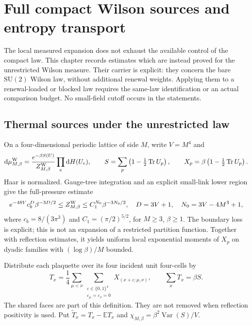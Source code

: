 \documentclass[11pt,oneside,openany]{book}
\theoremstyle{definition}
\theoremstyle{remark}
\newcommand{\E}{\mathbb E}
\newcommand{\dd}{\mathrm d}
\newcommand{\Tr}{\operatorname{Tr}}
\newcommand{\Var}{\operatorname{Var}}
\newcommand{\SU}{\mathrm{SU}}
\newcommand{\src}[2]{\cite[#2]{#1}}
\begin{document}
\chapter{Full compact Wilson sources and entropy transport}
\label{ch:full-compact-sources}
The local measured expansion does not exhaust the available control of
the compact law. This chapter records estimates which are instead
proved for the unrestricted Wilson measure. Their carrier is explicit:
they concern the bare $\SU(2)$ Wilson law, without additional renewal
weights. Applying them to a renewal-loaded or blocked law requires the
same-law identification or an actual comparison budget. No small-field
cutoff occurs in the statements.

\section{Thermal sources under the unrestricted law}
On a four-dimensional periodic lattice of side $M$, write $V=M^4$ and
\begin{equation}
 \dd\mu^{\rm W}_{M,\beta}
 =\frac{e^{-\beta S(U)}}{Z^{\rm W}_{M,\beta}}
                  \prod_e\dd H(U_e),\qquad
 S=\sum_p\left(1-\tfrac12\Tr U_p\right),\qquad
 X_p=\beta\left(1-\tfrac12\Tr U_p\right).
 \label{eq:full-Wilson-law}
\end{equation}
Haar is normalized. Gauge-tree integration and an explicit small-link
lower region give the full-pressure estimate
\begin{equation}
 e^{-48V}c_b^{D}\beta^{-3D/2}
 \le Z^{\rm W}_{M,\beta}
 \le C_1^{N_0}\beta^{-3N_0/2},\quad
 D=3V+1,\quad N_0=3V-4M^3+1,
 \label{eq:full-Wilson-pressure}
\end{equation}
where $c_b=8/(3\pi^3)$ and $C_1=(\pi/2)^{5/2}$, for $M\ge3$,
$\beta\ge1$. The boundary loss is explicit; this is not an expansion
of a restricted partition function. Together with reflection estimates,
it yields uniform local exponential moments of $X_p$ on dyadic
families with $(\log\beta)/M$ bounded. \src{F14}{V95--V97}

Distribute each plaquette over its four incident unit four-cells by
\begin{equation}
 T_x=\frac14\sum_{\mu<\nu}
 \sum_{\substack{\varepsilon\in\{0,1\}^4\\
                      \varepsilon_\mu=\varepsilon_\nu=0}}
 X_{(x+\varepsilon;\mu,\nu)},\qquad
                 \sum_xT_x=\beta S.
 \label{eq:full-Wilson-cell-energy}
\end{equation}
The shared faces are part of this definition. They are not removed
when reflection positivity is used. Put
$\widetilde T_x=T_x-\E T_x$ and
$\chi_{M,\beta}=\beta^2\Var(S)/V$.
\end{document}
